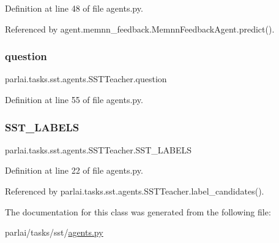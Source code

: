 Definition at line 48 of file agents.\+py.



Referenced by agent.\+memnn\+\_\+feedback.\+Memnn\+Feedback\+Agent.\+predict().

\mbox{\label{classparlai_1_1tasks_1_1sst_1_1agents_1_1SSTTeacher_a8c33e7285f005f10ada92d3207d61399}} 
\subsubsection{\texorpdfstring{question}{question}}
{\footnotesize\ttfamily parlai.\+tasks.\+sst.\+agents.\+S\+S\+T\+Teacher.\+question}



Definition at line 55 of file agents.\+py.

\mbox{\label{classparlai_1_1tasks_1_1sst_1_1agents_1_1SSTTeacher_aae023784a28998142cbaac66d9ebb1ff}} 
\subsubsection{\texorpdfstring{S\+S\+T\+\_\+\+L\+A\+B\+E\+LS}{SST\_LABELS}}
{\footnotesize\ttfamily parlai.\+tasks.\+sst.\+agents.\+S\+S\+T\+Teacher.\+S\+S\+T\+\_\+\+L\+A\+B\+E\+LS}



Definition at line 22 of file agents.\+py.



Referenced by parlai.\+tasks.\+sst.\+agents.\+S\+S\+T\+Teacher.\+label\+\_\+candidates().



The documentation for this class was generated from the following file\+:\begin{DoxyCompactItemize}
\item 
parlai/tasks/sst/\hyperlink{parlai_2tasks_2sst_2agents_8py}{agents.\+py}\end{DoxyCompactItemize}
